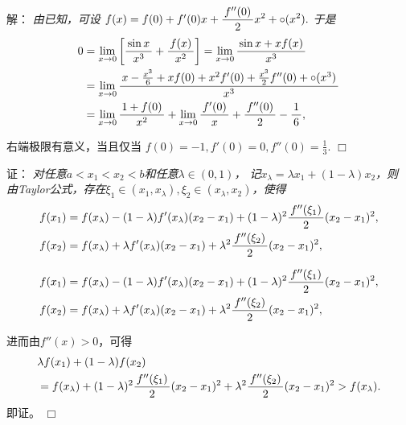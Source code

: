\begin{frame}
	\linespread{1.5}
	\pause
	
	\bigskip
	
	\small 解：\it 
	由已知，可设
	$f(x)=f(0)+f'(0)x+\displaystyle\frac{\,{f''(0)}\,}{\,{2}\,}x^2+\circ(x^2).$
	\pause
	于是
	\begin{align*}
		0&=\lim\limits_{x\to{0}}\left[\displaystyle\frac{\,{\sin x}\,}{\,{x^3}\,}+\displaystyle\frac{\,{f(x)}\,}{\,{x^2}\,}\right]
		=\lim\limits_{x\to{0}}\displaystyle\frac{\,{\sin x+xf(x)}\,}{\,{x^3}\,}\\
		&=\lim\limits_{x\to{0}}\displaystyle\frac{\,{x-\frac{x^3}6+xf(0)+x^2f'(0)+\frac{x^3}2f''(0)+\circ(x^3)}\,}{\,{x^3}\,}\\
		&=\lim\limits_{x\to{0}}\displaystyle\frac{\,{1+f(0)}\,}{\,{x^2}\,}+\lim\limits_{x\to{0}}\displaystyle\frac{\,{f'(0)}\,}{\,{x}\,}+\displaystyle\frac{\,{f''(0)}\,}{\,{2}\,}-\displaystyle\frac{\,{1}\,}{\,{6}\,},
	\end{align*}
	
	\pause
	右端极限有意义，当且仅当
	$f(0)=-1,f'(0)=0,f''(0)=\frac13.$
	\hfill$\Box$
\end{frame}

\begin{frame}
	\linespread{1.5}
	
	\pause
	\small 证：\it 
	对任意$a<x_1<x_2<b$和任意$\lambda\in(0,1)$，
	记$x_{\lambda}=\lambda x_1+(1-\lambda)x_2$，则
	由Taylor公式，存在$\xi_1\in(x_1,x_{\lambda}),
	\xi_2\in(x_{\lambda},x_2)$，使得
	\begin{align*}
		f(x_1)&=f(x_{\lambda})-(1-\lambda)f'(x_{\lambda})(x_2-x_1)
		+(1-\lambda)^2\displaystyle\frac{\,{f''(\xi_1)}\,}{\,{2}\,}(x_2-x_1)^2,\\
		f(x_2)&=f(x_{\lambda})+\lambda f'(x_{\lambda})(x_2-x_1)
		+\lambda^2\displaystyle\frac{\,{f''(\xi_2)}\,}{\,{2}\,}(x_2-x_1)^2,
	\end{align*}
\end{frame}

\begin{frame}
	\linespread{1.5}
	\small \it 
	\begin{align*}
		f(x_1)&=f(x_{\lambda})-(1-\lambda)f'(x_{\lambda})(x_2-x_1)
		+(1-\lambda)^2\displaystyle\frac{\,{f''(\xi_1)}\,}{\,{2}\,}(x_2-x_1)^2,\\
		f(x_2)&=f(x_{\lambda})+\lambda f'(x_{\lambda})(x_2-x_1)
		+\lambda^2\displaystyle\frac{\,{f''(\xi_2)}\,}{\,{2}\,}(x_2-x_1)^2,
	\end{align*}
	
	\pause
	进而由$f''(x)>0$，可得
	\begin{align*}
		&\lambda f(x_1)+(1-\lambda)f(x_2)\\
		&=f(x_{\lambda})+(1-\lambda)^2\displaystyle\frac{\,{f''(\xi_1)}\,}{\,{2}\,}(x_2-x_1)^2
		+\lambda^2\displaystyle\frac{\,{f''(\xi_2)}\,}{\,{2}\,}(x_2-x_1)^2>f(x_{\lambda}).
	\end{align*}
	即证。
	\hfill$\Box$
\end{frame}

